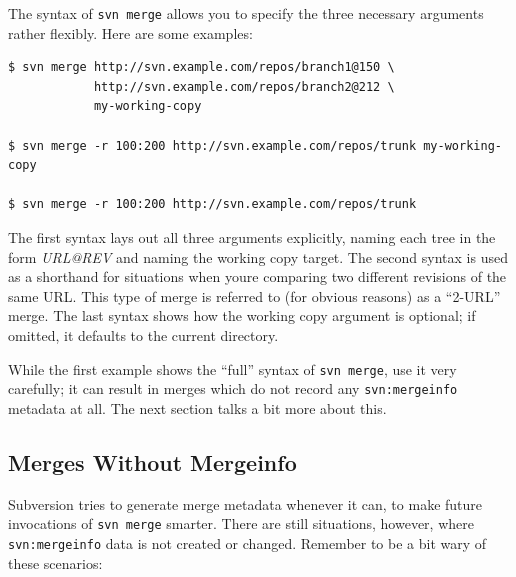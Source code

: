 The syntax of \texttt{svn\ merge} allows you to specify the three
necessary arguments rather flexibly. Here are some examples:

\begin{verbatim}
$ svn merge http://svn.example.com/repos/branch1@150 \
            http://svn.example.com/repos/branch2@212 \
            my-working-copy

$ svn merge -r 100:200 http://svn.example.com/repos/trunk my-working-copy

$ svn merge -r 100:200 http://svn.example.com/repos/trunk
\end{verbatim}

The first syntax lays out all three arguments explicitly, naming each
tree in the form \emph{URL@REV} and naming the working copy target. The
second syntax is used as a shorthand for situations when
you\textquotesingle re comparing two different revisions of the same
URL. This type of merge is referred to (for obvious reasons) as a
``2-URL'' merge. The last syntax shows how the working copy argument is
optional; if omitted, it defaults to the current directory.

While the first example shows the ``full'' syntax of
\texttt{svn\ merge}, use it very carefully; it can result in merges
which do not record any \texttt{svn:mergeinfo} metadata at all. The next
section talks a bit more about this.

\subsection{Merges Without Mergeinfo}\label{svn.branchmerge.nomergedata}

Subversion tries to generate merge metadata whenever it can, to make
future invocations of \texttt{svn\ merge} smarter. There are still
situations, however, where \texttt{svn:mergeinfo} data is not created or
changed. Remember to be a bit wary of these scenarios:

